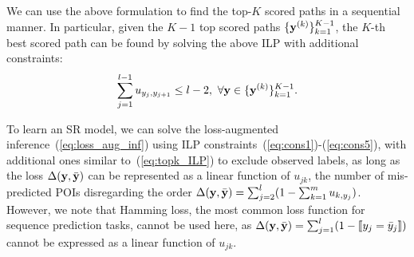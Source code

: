 We can use the above formulation to find the top-$K$ scored paths in a sequential manner. 
In particular, given the $K\!-\!1$ top scored paths $\{\mathbf{y}^{(k)}\}_{k=1}^{K-1}$, 
the $K\!$-th best scored path can be found by solving the above ILP with additional constraints:
\begin{equation}
\label{eq:topk_ILP}
\sum_{j=1}^{l-1} u_{y_j, y_{j+1}} \le l-2, ~\forall \mathbf{y} \in \{\mathbf{y}^{(k)}\}_{k=1}^{K-1}.
\end{equation}

To learn an SR model, we can solve the loss-augmented inference~(\ref{eq:loss_aug_inf}) 
using ILP constraints~(\ref{eq:cons1})-(\ref{eq:cons5}),
with additional ones similar to~(\ref{eq:topk_ILP}) to exclude observed labels,
as long as the loss $\Delta(\mathbf{y},\bar{\mathbf{y}})$ can be represented as a linear function of $u_{jk}$,
\eg the number of mis-predicted POIs disregarding the order $\Delta(\mathbf{y}, \bar{\mathbf{y}}) = \sum_{j=2}^l (1 - \sum_{k=1}^m u_{k, y_j})$.
However, we note that Hamming loss, the most common loss function for sequence prediction tasks,
cannot be used here, as $\Delta(\mathbf{y},\bar{\mathbf{y}}) = \sum_{j=1}^l (1 - \llbracket y_j = \bar y_j \rrbracket)$
cannot be expressed as a linear function of $u_{jk}$.



